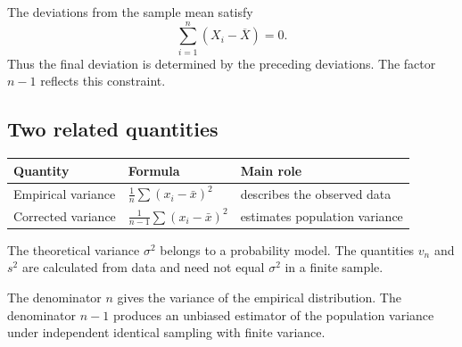 \begin{remarkbox}
The deviations from the sample mean satisfy
\[
\sum_{i=1}^n(X_i-\overline X)=0.
\]
Thus the final deviation is determined by the preceding deviations. The factor
\(n-1\) reflects this constraint.
\end{remarkbox}

\subsection*{Two related quantities}

\begin{center}
\begin{tabular}{lll}
\toprule
Quantity & Formula & Main role \\
\midrule
Empirical variance & \(\frac1n\sum(x_i-\bar x)^2\) & describes the observed data \\
Corrected variance & \(\frac1{n-1}\sum(x_i-\bar x)^2\) & estimates population variance \\
\bottomrule
\end{tabular}
\end{center}

The theoretical variance \(\sigma^2\) belongs to a probability model. The
quantities \(v_n\) and \(s^2\) are calculated from data and need not equal
\(\sigma^2\) in a finite sample.

\begin{summarybox}
The denominator \(n\) gives the variance of the empirical distribution. The
denominator \(n-1\) produces an unbiased estimator of the population variance
under independent identical sampling with finite variance.
\end{summarybox}
